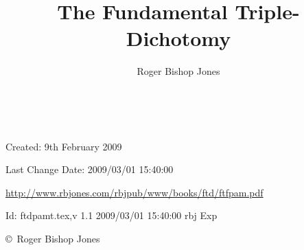 \documentclass[10pt,a4paper.titlepage,openany,twocolumn]{article}
\author{Roger Bishop Jones}
\title{The Fundamental Triple-Dichotomy}
\date{\ }
\begin{document}
\begin{titlepage}
\maketitle
\begin{abstract}
\end{abstract}

\vfill

\begin{centering}

{\footnotesize

Created: 9th February 2009

Last Change $ $Date: 2009/03/01 15:40:00 $ $

\href{http://www.rbjones.com/rbjpub/www/books/ftd/ftdpam.pdf}
{http://www.rbjones.com/rbjpub/www/books/ftd/ftfpam.pdf}

$ $Id: ftdpamt.tex,v 1.1 2009/03/01 15:40:00 rbj Exp $ $

\copyright\ Roger Bishop Jones

}%

\end{centering}

\thispagestyle{empty}
\end{titlepage}

\onecolumn

{\parskip=0pt\tableofcontents}

\vfill

\pagebreak

\twocolumn
\end{document}
